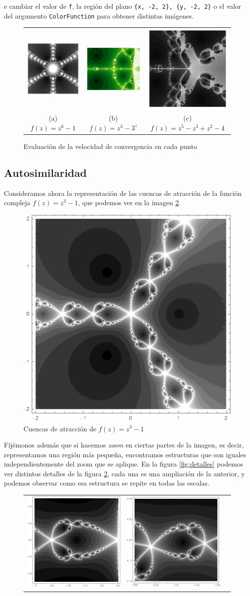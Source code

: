 e cambiar el valor de \verb|f|, la región del plano \verb|{x, -2, 2}, {y, -2, 2}| o el valor del argumento \verb|ColorFunction| para obtener distintas imágenes.

\begin{figure}[ht]
    \centering
    \begin{tabular}{ccc}
      \includegraphics[scale=0.33]{img/C2/cuencas-velocidad-1.png} &   \includegraphics[scale=0.31]{img/C2/cuencas-velocidad-2.png} &   \includegraphics[scale=0.33]{img/C2/cuencas-velocidad-3.png} \\
      (a) $f(z)=z^6-1$ & (b) $f(z)=z^3-3^z$ & (c) $f(z)=z^5-z^3+z^2-4$ \\[6pt]
    \end{tabular}
    \caption{Evaluación de la velocidad de convergencia en cada punto}
    \label{fig:cuencas-velocidad}
\end{figure}

\newpage

\subsection{Autosimilaridad}
\label{subsection:autosimilaridad}

Consideramos ahora la representación de las cuencas de atracción de la función compleja $f(z)=z^3-1$, que podemos ver en la imagen \ref{fig:cuencas-autosimilaridad}.

\begin{figure} [ht]
\centering
\includegraphics[scale = 0.5]{img/C2/cuencas-autosimilaridad.png}
\caption{Cuencas de atracción de $f(z)=z^3-1$}
    \label{fig:cuencas-autosimilaridad}
\end{figure}

Fijémonos además que si hacemos \textit{zoom} en ciertas partes de la imagen, es decir, representamos una región más pequeña, encontramos estructuras que son iguales independientemente del zoom que se aplique. En la figura \ref{fig:detalles} podemos ver distintos detalles de la figura \ref{fig:cuencas-autosimilaridad}, cada una es una ampliación de la anterior, y podemos observar como esa estructura se repite en todas las escalas.


\begin{figure}[ht]
    \begin{tabular}{ccc}
      \includegraphics[scale=0.33]{./img/C2/detalle-1.png} &   \includegraphics[scale=0.33]{./img/C2/detalle-2.png} &   \includegraphics[scale
\end{tabular}
\end{figure}
